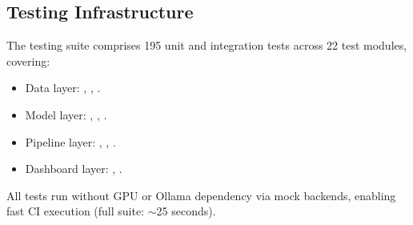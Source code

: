 \subsection{Testing Infrastructure}

The testing suite comprises 195 unit and integration tests across 22 test modules, covering:
\begin{itemize}
  \item Data layer: , , .
  \item Model layer: , , .
  \item Pipeline layer: , , .
  \item Dashboard layer: , .
\end{itemize}

All tests run without GPU or Ollama dependency via mock backends, enabling fast CI execution (full suite: $\sim$25 seconds).
